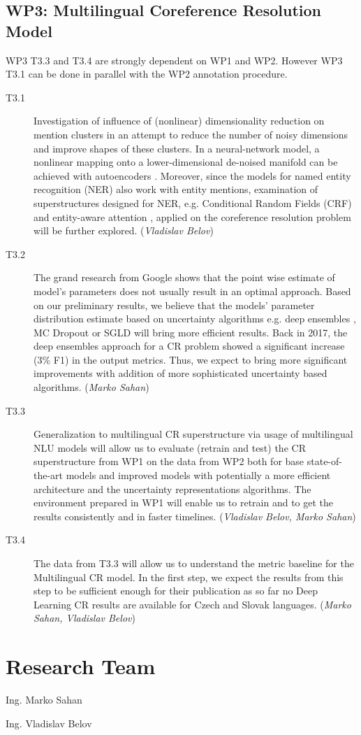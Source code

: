 \subsection*{WP3: Multilingual Coreference Resolution Model}

WP3 T3.3 and T3.4  are strongly dependent on WP1 and WP2. However WP3 T3.1 can be done in parallel with the WP2 annotation procedure.

\begin{description}
	\item [T3.1] Investigation of influence of (nonlinear) dimensionality reduction on mention clusters in an attempt to reduce the number of noisy dimensions and improve shapes of these clusters. In a neural-network model, a nonlinear mapping onto a lower-dimensional de-noised manifold can be achieved with autoencoders \cite{autoencoders-Zabalza2016,autoencoders-Sahay2019}. Moreover, since the models for named entity recognition (NER) also work with entity mentions, examination of superstructures designed for NER, e.g. Conditional Random Fields (CRF) \cite{ner-Strakova2019,ner-Zhanming2019} and entity-aware attention \cite{ner-Yamada2020}, applied on the coreference resolution problem will be further explored. (\textit{Vladislav Belov})
	\item [T3.2] The grand research from Google \cite{ovadia2019can} shows that the point wise estimate of model’s parameters does not usually result in an optimal approach. Based on our preliminary results, we believe that the models’ parameter distribution estimate based on uncertainty algorithms e.g. deep ensembles \cite{lakshminarayanan2016simple}, MC Dropout \cite{gal2017deep} or SGLD \cite{welling2011bayesian} will bring more efficient results. Back in 2017, the deep ensembles approach for a CR problem \cite{lee2017end} showed a significant increase (3\% F1) in the output metrics. Thus, we expect to bring more significant improvements with addition of more sophisticated uncertainty based algorithms. (\textit{Marko Sahan})
	\item [T3.3] Generalization to multilingual CR superstructure via usage of multilingual NLU models will allow us to evaluate (retrain and test) the CR superstructure from WP1 on the data from WP2 both for base state-of-the-art models and improved models with potentially a more efficient architecture and the uncertainty representations algorithms. The environment prepared in WP1 will enable us to retrain and to get the results consistently and in faster timelines. (\textit{Vladislav Belov, Marko Sahan})	
	\item  [T3.4] The data from T3.3 will allow us to understand the metric baseline for the Multilingual CR model. In the first step, we expect the results from this step to be sufficient enough for their publication as so far no Deep Learning CR results are available for Czech and Slovak languages. (\textit{Marko Sahan, Vladislav Belov})

\end{description}


\section{Research Team}\label{sec:research_team}
\begin{description}
	\item Ing. Marko Sahan
	\item Ing. Vladislav Belov
\end{description}
